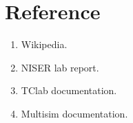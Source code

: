 
\chapter{Reference}
\begin{enumerate}
	\item Wikipedia.
	\item NISER lab report.
	\item TClab documentation.
	\item Multisim documentation. 
\end{enumerate}